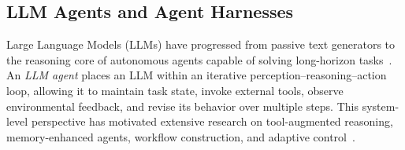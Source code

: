 

\subsection{LLM Agents and Agent Harnesses}

Large Language Models (LLMs) have progressed from passive text generators to the reasoning core of autonomous agents capable of solving long-horizon tasks~\citep{yao2023react,zhang2024codeagent,he2024webvoyager}. An \emph{LLM agent} places an LLM within an iterative perception--reasoning--action loop, allowing it to maintain task state, invoke external tools, observe environmental feedback, and revise its behavior over multiple steps. This system-level perspective has motivated extensive research on tool-augmented reasoning, memory-enhanced agents, workflow construction, and adaptive control~\citep{gao2026survey,xu2026lifeharness}.

